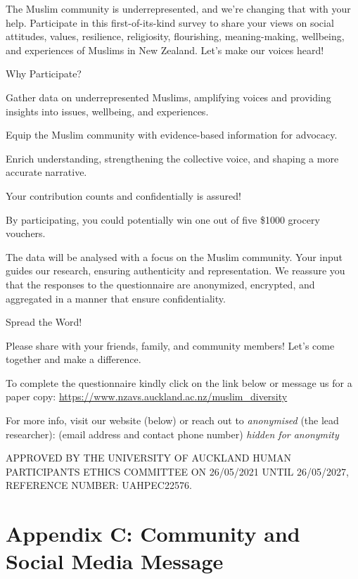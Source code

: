 \documentclass[
]{interact}
\begin{document}
\noindent The Muslim community is underrepresented, and we're changing
that with your help. Participate in this first-of-its-kind survey to
share your views on social attitudes, values, resilience, religiosity,
flourishing, meaning-making, wellbeing, and experiences of Muslims in
New Zealand. Let's make our voices heard!

\noindent Why Participate?

\noindent Gather data on underrepresented Muslims, amplifying voices and
providing insights into issues, wellbeing, and experiences.

\noindent Equip the Muslim community with evidence-based information for
advocacy.

\noindent Enrich understanding, strengthening the collective voice, and
shaping a more accurate narrative.

\noindent Your contribution counts and confidentially is assured!

\noindent By participating, you could potentially win one out of five
\$1000 grocery vouchers.

\noindent The data will be analysed with a focus on the Muslim
community. Your input guides our research, ensuring authenticity and
representation. We reassure you that the responses to the questionnaire
are anonymized, encrypted, and aggregated in a manner that ensure
confidentiality.

\noindent Spread the Word!

\noindent Please share with your friends, family, and community members!
Let's come together and make a difference.

\noindent To complete the questionnaire kindly click on the link below
or message us for a paper copy:
\url{https://www.nzavs.auckland.ac.nz/muslim_diversity}

\noindent For more info, visit our website (below) or reach out to
\emph{anonymised} (the lead researcher): (email address and contact
phone number) \emph{hidden for anonymity}

\noindent APPROVED BY THE UNIVERSITY OF AUCKLAND HUMAN PARTICIPANTS
ETHICS COMMITTEE ON 26/05/2021 UNTIL 26/05/2027, REFERENCE NUMBER:
UAHPEC22576.

\newpage{}

\section{Appendix C: Community and Social Media
Message}\label{appendix-c-community-and-social-media-message}
\end{document}
